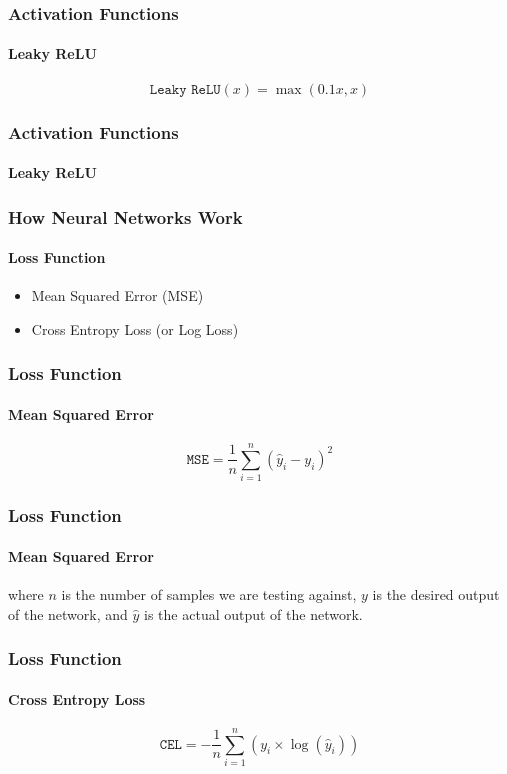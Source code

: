 \documentclass{beamer}
\begin{document}
\begin{frame}
\frametitle{Activation Functions}
\framesubtitle{Leaky ReLU}
\begin{equation}
    \texttt{Leaky ReLU}(x) = \max(0.1x, x)
    \label{eq:leaky-relu}
\end{equation}
\end{frame}

\begin{frame}
\frametitle{Activation Functions}
\framesubtitle{Leaky ReLU}
\begin{figure}[h!]
    \begin{center}
    \end{center}
\end{figure}
\end{frame}

\begin{frame}
\frametitle{How Neural Networks Work}
\framesubtitle{Loss Function}
\begin{itemize}
    \item Mean Squared Error (MSE)
    \item Cross Entropy Loss (or Log Loss)
\end{itemize}
\end{frame}

\begin{frame}
\frametitle{Loss Function}
\framesubtitle{Mean Squared Error}
\begin{equation}
    \texttt{MSE} = \frac{1}{n} \sum_{i=1}^{n} (\hat{y}_i - y_i)^2
    \label{eq:MSE}
\end{equation}
\end{frame}

\begin{frame}
\frametitle{Loss Function}
\framesubtitle{Mean Squared Error}
where $n$ is the number of samples we are testing against, $y$ is the desired output of the network, and $\hat{y}$ is the actual output of the network.
\end{frame}

\begin{frame}
\frametitle{Loss Function}
\framesubtitle{Cross Entropy Loss}
\begin{equation}
    \texttt{CEL} = -\frac{1}{n}\sum_{i=1}^{n}(y_i\times\log(\hat{y}_i))
    \label{eq:CEL}
\end{equation}
\end{frame}
\end{document}
